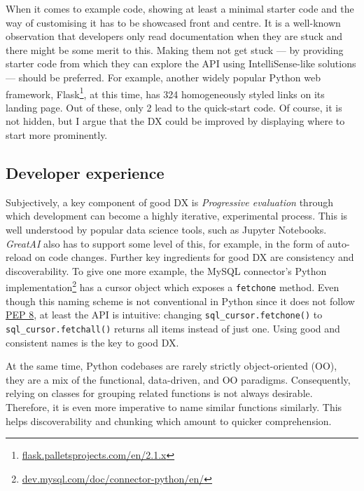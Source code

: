 When it comes to example code, showing at least a minimal starter code and the way of customising it has to be showcased front and centre. It is a well-known observation that developers only read documentation when they are stuck and there might be some merit to this. Making them not get stuck --- by providing starter code from which they can explore the API using IntelliSense-like solutions --- should be preferred. For example, another widely popular Python web framework, Flask\footnote{\href{https://flask.palletsprojects.com/en/2.1.x/}{flask.palletsprojects.com/en/2.1.x}}, at this time, has 324 homogeneously styled links on its landing page. Out of these, only 2 lead to the quick-start code. Of course, it is not hidden, but I argue that the DX could be improved by displaying where to start more prominently.

\subsection{Developer experience}

Subjectively, a key component of good DX is \textit{Progressive evaluation} through which development can become a highly iterative, experimental process. This is well understood by popular data science tools, such as Jupyter Notebooks. \textit{GreatAI} also has to support some level of this, for example, in the form of auto-reload on code changes. Further key ingredients for good DX are consistency and discoverability. To give one more example, the MySQL connector's Python implementation\footnote{\href{https://dev.mysql.com/doc/connector-python/en/}{dev.mysql.com/doc/connector-python/en/}} has a cursor object which exposes a \texttt{fetchone} method. Even though this naming scheme is not conventional in Python since it does not follow \href{https://peps.python.org/pep-0008/}{PEP 8}, at least the API is intuitive: changing \texttt{sql\_cursor.fetchone()} to \texttt{sql\_cursor.fetchall()} returns all items instead of just one. Using good and consistent names is the key to good DX.

At the same time, Python codebases are rarely strictly object-oriented (OO), they are a mix of the functional, data-driven, and OO paradigms. Consequently, relying on classes for grouping related functions is not always desirable. Therefore, it is even more imperative to name similar functions similarly. This helps discoverability and chunking \cite{hermans2021programmer} which amount to quicker comprehension.

